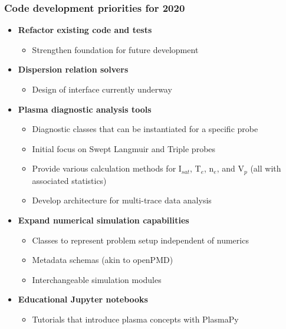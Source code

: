 \documentclass[default,compress]{beamer}
\begin{document}
\begin{frame}[plain]
    \frametitle{Code development priorities for 2020}
    \begin{itemize}
    \item \textbf{Refactor existing code and tests}
        \begin{itemize}
        \item Strengthen foundation for future development
        \end{itemize}
    \item \textbf{Dispersion relation solvers}
        \begin{itemize}
        \item Design of interface currently underway
        \end{itemize}
    \item \textbf{Plasma diagnostic analysis tools}
        \begin{itemize}
        \item Diagnostic classes that can be instantiated for a specific probe
        \item Initial focus on Swept Langmuir and Triple probes
        \item Provide various calculation methods for I$_{sat}$, T$_e$, n$_e$, and V$_p$ (all with associated statistics)
        \item Develop architecture for multi-trace data analysis
        \end{itemize}
    \item \textbf{Expand numerical simulation capabilities}
        \begin{itemize}
        \item Classes to represent problem setup independent of numerics
        \item Metadata schemas (akin to openPMD)
        \item Interchangeable simulation modules
        \end{itemize}
    \item \textbf{Educational Jupyter notebooks}
        \begin{itemize}
        \item Tutorials that introduce plasma concepts with PlasmaPy
        \end{itemize}
    \end{itemize}
\end{frame}
\end{document}

